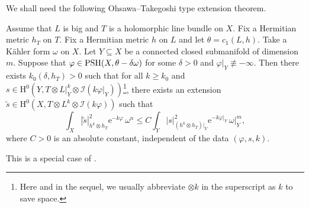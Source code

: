 We shall need the following Ohsawa--Takegoshi type extension theorem.
\begin{theorem}\label{thm:OT_ext} Assume that $L$ is big and $T$ is a holomorphic line bundle on $X$. Fix a Hermitian metric $h_T$ on $T$.
Fix a Hermitian metric $h$ on $L$ and let $\theta=c_1(L,h)$.
Take a Kähler form $\omega$ on $X$. Let $Y\subseteq X$ be a connected closed submanifold of dimension $m$.
Suppose that $\varphi \in \mathrm{PSH}(X,\theta - \delta \omega)$ for some $\delta>0$ and $\varphi|_Y\not\equiv -\infty$.
Then there exists $k_0(\delta,h_T)>0$ such that for all $k \geq k_0$ and $s \in \mathrm{H}^0(Y, T\otimes L|_Y^k \otimes \mathcal{I}(k\varphi|_Y))$\footnote{Here and in the sequel, we usually abbreviate $\otimes k$ in the superscript as $k$ to save space.}, there exists an extension $\tilde s \in \mathrm{H}^0(X, T\otimes L^k \otimes \mathcal{I}(k\varphi))$ such that
\[
\int_X |\tilde{s}|^2_{h^k\otimes h_T}\mathrm{e}^{-k\varphi}\,\omega^n \leq C \int_Y |s|^2_{(h^k\otimes h_T)|_Y} \mathrm{e}^{-k\varphi|_Y}\,\omega|_Y^m,
\]
where $C>0$ is an absolute constant, independent of the data $(\varphi,s,k)$.
\end{theorem}
This is a special case of \cite[Theorem~1.4]{His12}.


